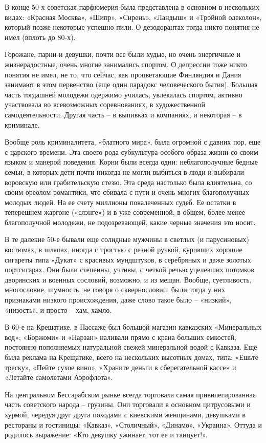 В конце 50-х советская парфюмерия была представлена в основном в нескольких
видах: «Красная Москва», «Шипр», «Сирень», «Ландыш» и «Тройной одеколон»,
который позже некоторые успешно пили. О дезодорантах тогда никто понятия не
имел (вплоть до 80-х). 

Горожане, парни и девушки, почти все были худые, но очень энергичные и
жизнерадостные, очень многие занимались спортом. О депрессии тоже никто понятия
не имел, не то, что сейчас, как процветающие Финляндия и Дания занимают в этом
первенство (еще один парадокс человеческого бытия). Большая часть тогдашней
молодежи одержимо училась, увлекалась спортом, активно участвовала во
всевозможных соревнованиях, в художественной самодеятельности. Другая часть – в
выпивках и компаниях, и некоторая – в криминале.

Вообще роль криминалитета, «блатного мира», была огромной с давних пор, еще с
царского времени. Эта своего рода субкультура особого образа жизни со своим
языком и манерой поведения. Корни были всегда одни: неблагополучные бедные
семьи, в которых дети почти никогда не могли выбиться в люди и выбирали
воровскую или грабительскую стезю. Эта среда настолько была влиятельна, со
своим ореолом романтики, что сбивала с пути и очень многих благополучных
молодых людей. На ее счету миллионы покалеченных судеб. Ее остатки в теперешнем
жаргоне («слэнге») и в уже современной, в общем, более-менее благополучной
молодежи, не подозревающей, какие черные значения это носит. 

В те далекие 50-е бывали еще солидные мужчины в светлых (и парусиновых)
костюмах, в шляпах, иногда с тростью с резной ручкой, куривших хорошие сигареты
типа «Дукат» с красивых мундштуков, в серебряных и даже золотых портсигарах.
Они были степенны, учтивы, с четкой речью уцелевших потомков дворянских и
военных сословий, возможно, и из мещан. Вообще, суетливость, многословие,
шумность, не говоря о сквернословии, были тогда у них признаками низкого
происхождения, даже слово такое было – «низкий», «низость», и просто – хам,
хамло.

В 60-е на Крещатике, в Пассаже был большой магазин кавказских «Минеральных
вод»; «Боржоми» и «Нарзан» наливали прямо с крана больших емкостей, постоянно
пополняемых натуральной свежей минеральной водой с Кавказа. Еще была реклама на
Крещатике, всего на нескольких высотных домах, типа: «Ешьте треску», «Пейте
сухое вино», «Храните деньги в сберегательной кассе» и «Летайте самолетами
Аэрофлота».

На центральном Бессарабском рынке всегда торговала самая привилегированная
часть советского народа – грузины. Они торговали в основном цитрусовыми и
хурмой, чередуя друг друга походами с киевскими женщинами, девушками в
рестораны и гостиницы: «Кавказ», «Столичный», «Динамо», «Украина». Оттуда и
родилось выражение: «Кто девушку ужинает, тот ее и танцует!».

